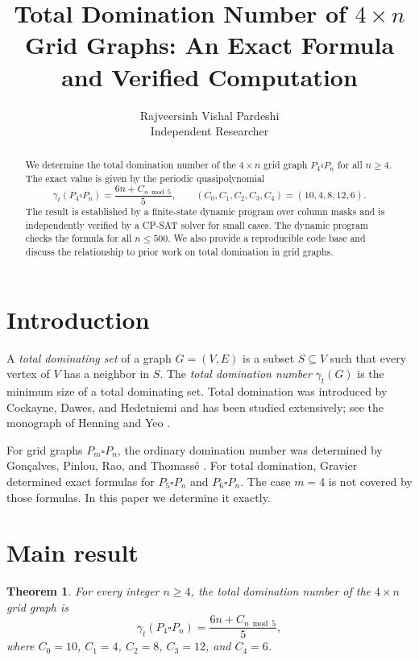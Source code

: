 \documentclass[11pt]{article}
\title{Total Domination Number of $4 \times n$ Grid Graphs: An Exact Formula and Verified Computation}
\author{Rajveersinh Vishal Pardeshi\\Independent Researcher}
\date{}
\newtheorem{theorem}{Theorem}
\begin{document}
\maketitle

\begin{abstract}
We determine the total domination number of the $4 \times n$ grid graph $P_4 \square P_n$
for all $n \ge 4$. The exact value is given by the periodic quasipolynomial
\[
\gamma_t(P_4 \square P_n)=\frac{6n+C_{n \bmod 5}}{5},
\qquad
(C_0,C_1,C_2,C_3,C_4)=(10,4,8,12,6).
\]
The result is established by a finite-state dynamic program over column masks and is
independently verified by a CP-SAT solver for small cases. The dynamic program checks
the formula for all $n \le 500$. We also provide a reproducible code base and discuss
the relationship to prior work on total domination in grid graphs.
\end{abstract}

\section{Introduction}

A \emph{total dominating set} of a graph $G=(V,E)$ is a subset $S \subseteq V$ such that
every vertex of $V$ has a neighbor in $S$. The \emph{total domination number}
$\gamma_t(G)$ is the minimum size of a total dominating set. Total domination was
introduced by Cockayne, Dawes, and Hedetniemi \cite{cockayne1980} and has been studied
extensively; see the monograph of Henning and Yeo \cite{henning2013}.

For grid graphs $P_m \square P_n$, the ordinary domination number was determined by
Gon\c{c}alves, Pinlou, Rao, and Thomass\'e \cite{goncalves2011}. For total domination,
Gravier \cite{gravier2002} determined exact formulas for $P_5 \square P_n$ and
$P_6 \square P_n$. The case $m=4$ is not covered by those formulas.
In this paper we determine it exactly.

\section{Main result}

\begin{theorem}
For every integer $n \ge 4$, the total domination number of the $4 \times n$ grid graph is
\[
\gamma_t(P_4 \square P_n)=\frac{6n+C_{n \bmod 5}}{5},
\]
where $C_0=10$, $C_1=4$, $C_2=8$, $C_3=12$, and $C_4=6$.
\end{theorem}
\end{document}
